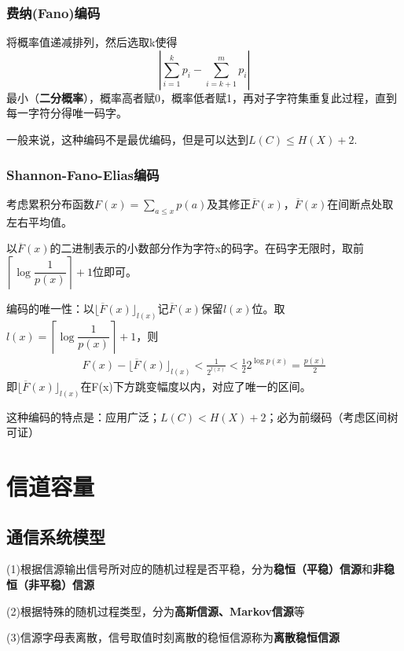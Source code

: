 \documentclass{ctexbook}
\begin{document}
\subsection{费纳(Fano)编码}

将概率值递减排列，然后选取k使得
\[\left|\sum_{i=1}^k p_i-\sum_{i=k+1}^m p_i\right|\]
最小（\textbf{二分概率}），概率高者赋0，概率低者赋1，再对子字符集重复此过程，直到每一字符分得唯一码字。

一般来说，这种编码不是最优编码，但是可以达到$L(C)\leq H(X)+2$.

\subsection{Shannon-Fano-Elias编码}

考虑累积分布函数$F(x)=\sum_{a\leq x}p(a)$及其修正$\overline{F}(x)$，$\overline{F}(x)$在间断点处取左右平均值。

以$\overline{F}(x)$的二进制表示的小数部分作为字符x的码字。在码字无限时，取前$\left\lceil \log\dfrac{1}{p(x)}\right\rceil+1$位即可。

编码的唯一性：以$\lfloor \overline{F}(x)\rfloor_{l(x)}$记$\overline{F}(x)$保留$l(x)$位。取$l(x)=\left\lceil \log\dfrac{1}{p(x)}\right\rceil+1$，则
\begin{align*}
    F(x)-\lfloor \overline{F}(x)\rfloor_{l(x)}<\frac{1}{2^{l(x)}}<\frac{1}{2}2^{\log p(x)}=\frac{p(x)}{2}
\end{align*}
即$\lfloor \overline{F}(x)\rfloor_{l(x)}$在F(x)下方跳变幅度以内，对应了唯一的区间。

这种编码的特点是：应用广泛；$L(C)<H(X)+2$；必为前缀码（考虑区间树可证）

\chapter{信道容量}

\section{通信系统模型}

\begin{definition}[信源模型]
    (1)根据信源输出信号所对应的随机过程是否平稳，分为\textbf{稳恒（平稳）信源}和\textbf{非稳恒（非平稳）信源}

    (2)根据特殊的随机过程类型，分为\textbf{高斯信源、Markov信源}等

    (3)信源字母表离散，信号取值时刻离散的稳恒信源称为\textbf{离散稳恒信源}
\end{definition}
\end{document}
